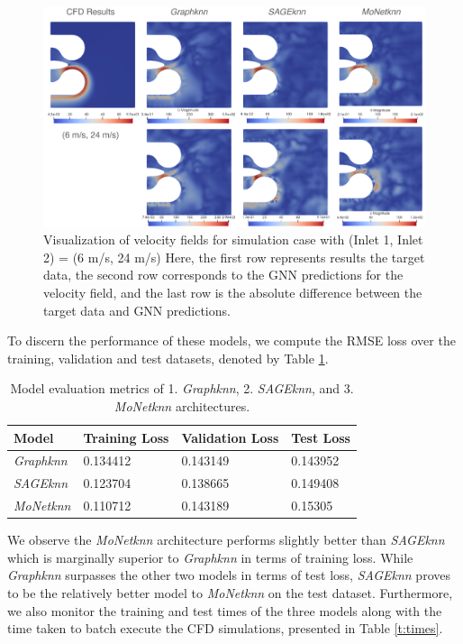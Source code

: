 \begin{figure}[ht]
    \centering
    \includegraphics[width=14cm]{images/Methodology/Asset 14.png}
    \caption{Visualization of velocity fields for simulation case with (Inlet 1, Inlet 2) = (6 m/s, 24 m/s) Here, the first row represents results the target data, the second row corresponds to the GNN predictions for the velocity field, and the last row is the absolute difference between the target data and GNN predictions.} 
    \label{allvel4}
\end{figure}
To discern the performance of these models, we compute the \gls{RMSE} loss over the training, validation and test datasets, denoted by Table \ref{t:predloss}.
\begin{table}[ht]
    \centering
    \caption{Model evaluation metrics of  1. \textit{Graphknn}, 2. \textit{SAGEknn}, and 3. \textit{MoNetknn} architectures. } 
    \label{t:predloss}
    \begin{tabular}{|l|l|l|l|}
    \hline
    \textbf{Model} & \textbf{Training Loss} & \textbf{Validation Loss} & \textbf{Test Loss}\\
    \hline
     \textit{Graphknn} & 0.134412& 0.143149 & 0.143952   \\
    \hline
    \textit{SAGEknn}& 0.123704 & 0.138665 & 0.149408 \\
    \hline
    \textit{MoNetknn} & 0.110712  & 0.143189& 0.15305  \\
    \hline
    \end{tabular}
\end{table}
We observe the \textit{MoNetknn} architecture performs slightly better than \textit{SAGEknn} which is marginally superior to \textit{Graphknn} in terms of training loss. While \textit{Graphknn} surpasses the other two models in terms of test loss, \textit{SAGEknn} proves to be the relatively better model to \textit{MoNetknn} on the test dataset. Furthermore, we also monitor the training and test times of the three models along with the time taken to batch execute the CFD simulations, presented in Table \ref{t:times}. 
